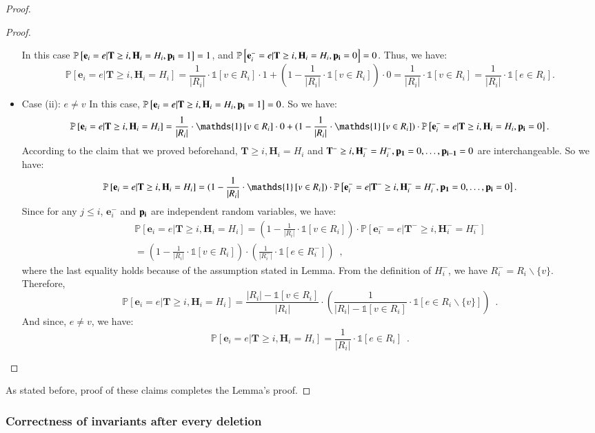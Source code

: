 \documentclass[11pt]{article}
\renewcommand{\Pr}[1]{\ensuremath{\mathbb{P}\left[#1\right]}}
\newcommand{\ind}[1]{\ensuremath{\mathds{1}\left[#1\right]}}
\newcommand{\bE}{\ensuremath{\mathbf{e}}}
\newcommand{\bT}{\ensuremath{\mathbf{T}}}
\newcommand{\bH}{\ensuremath{\mathbf{H}}}
\begin{document}
\begin{proof}
\begin{proof}
\begin{itemize}
In this case 
$\Pr{\bE_i = e|\bT \geq i, \bH_i = H_i, \bold{p_i} = 1} = 1$, and $\Pr{\bE_i^- = e|\bT \geq i, \bH_i = H_i, \bold{p_i} = 0} = 0$. Thus, we have: 
$$\Pr{\bE_i = e|\bT \geq i, \bH_i = H_i} = 
\frac{1}{|R_i|} \cdot \ind{v \in R_i} \cdot 1
+ (1 - \frac{1}{|R_i|} \cdot \ind{v \in R_i}) \cdot 0 = \frac{1}{|R_i|} \cdot \ind{v \in R_i} = \frac{1}{|R_i|} \cdot \ind{e \in R_i}.
 $$
\item Case (ii): $e \neq v$
In this case, $\Pr{\bE_i = e|\bT \geq i, \bH_i = H_i, \bold{p_i} = 1} = 0$. So we have: 
$$\Pr{\bE_i = e|\bT \geq i, \bH_i = H_i} =
\frac{1}{|R_i|} \cdot \ind{v \in R_i} \cdot 0
+ (1 - \frac{1}{|R_i|} \cdot \ind{v \in R_i}) \cdot 
\Pr{\bE_i^- = e|\bT \geq i, \bH_i = H_i, \bold{p_i} = 0}. $$
According to the claim that we proved beforehand, $\bT \geq i, \bH_i = H_i$ and $\bT^- \geq i, \bH_i^- = H_i^-, \bold{p_1} = 0, \dots, \bold{p_{i - 1}} = 0$ are interchangeable. So we have: 
$$\Pr{\bE_i = e|\bT \geq i, \bH_i = H_i} =
(1 - \frac{1}{|R_i|} \cdot \ind{v \in R_i}) \cdot 
\Pr{\bE_i^- = e| \bT^- \geq i, \bH_i^- = H_i^-, \bold{p_1} = 0, \dots, \bold{p_i} = 0}.
$$
Since for any $j \leq i$, $\bE_i^-$ and $\bold{p_i}$ are independent random variables, we have: 
\begin{align*}
\Pr{\bE_i = e|\bT \geq i, \bH_i = H_i} =
(1 - \frac{1}{|R_i|} \cdot \ind{v \in R_i}) \cdot 
\Pr{\bE_i^- = e| \bT^- \geq i, \bH_i^- = H_i^-} \\
= (1 - \frac{1}{|R_i|} \cdot \ind{v \in R_i}) \cdot 
\left(\frac{1}{|R_i^-|} \cdot \ind{e \in R_i^-}\right) \enspace, 
\end{align*}
where the last equality holds because of the assumption stated in Lemma. From the definition of $H_i^-$, we have $R_i^- = R_i \backslash \{v\}$. Therefore, 
$$\Pr{\bE_i = e|\bT \geq i, \bH_i = H_i} = 
\frac{|R_i| - \ind{v \in R_i}}{|R_i|} \cdot 
\left(\frac{1}{|R_i| - \ind{v \in R_i} } \cdot \ind{e \in R_i \backslash \{v\}}\right) \enspace .
$$
And since, $e \neq v$, we have: 
$$\Pr{\bE_i = e|\bT \geq i, \bH_i = H_i} =
\frac{1}{|R_i|} \cdot \ind{e \in R_i} \enspace . $$
\end{itemize}
\end{proof}
As stated before, proof of these claims completes the Lemma's proof.
\end{proof}




\subsubsection{Correctness of invariants after every deletion}
\end{document}
